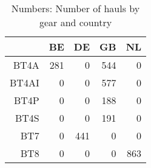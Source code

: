 \begin{table}[ht]
\centering
\begin{tabular}{rrrrr}
  \hline
 & BE & DE & GB & NL \\ 
  \hline
BT4A & 281 & 0 & 544 & 0 \\ 
  BT4AI & 0 & 0 & 577 & 0 \\ 
  BT4P & 0 & 0 & 188 & 0 \\ 
  BT4S & 0 & 0 & 191 & 0 \\ 
  BT7 & 0 & 441 & 0 & 0 \\ 
  BT8 & 0 & 0 & 0 & 863 \\ 
   \hline
\end{tabular}
\caption{Numbers: Number of hauls by gear and country} 
\end{table}
